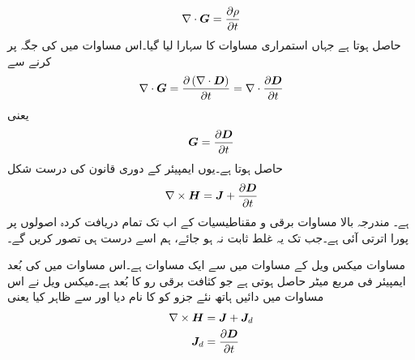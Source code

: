 \begin{align*}
\nabla \cdot {\ensuremath{{\boldsymbol{G}}}}=\frac{\partial \rho}{\partial t}
\end{align*}
حاصل ہوتا ہے جہاں استمراری مساوات کا سہارا لیا گیا۔اس مساوات میں  کی جگہ  پر کرنے سے
\begin{align*}
\nabla \cdot {\ensuremath{{\boldsymbol{G}}}}=\frac{\partial \left(\nabla \cdot {\ensuremath{{\boldsymbol{D}}}} \right)}{\partial t}=\nabla \cdot \frac{\partial {\ensuremath{{\boldsymbol{D}}}}}{\partial t}
\end{align*}
یعنی
 \begin{align*}
{\ensuremath{{\boldsymbol{G}}}}=\frac{\partial {\ensuremath{{\boldsymbol{D}}}}}{\partial t}
\end{align*}
حاصل ہوتا ہے۔یوں ایمپیئر کے دوری قانون کی درست شکل
\begin{align}\label{مساوات-میکس_ویل_دوسری_مساوات_نقطہ_شکل}
\nabla \times {\ensuremath{{\boldsymbol{H}}}}={{\boldsymbol{J}}}+\frac{\partial {\ensuremath{{\boldsymbol{D}}}}}{\partial t}
\end{align}
ہے۔ مندرجہ بالا مساوات برقی و مقناطیسیات کے اب تک تمام دریافت کردہ اصولوں پر پورا اترتی آئی ہے۔جب تک یہ غلط ثابت نہ ہو جائے، ہم اسے درست ہی تصور کریں گے۔

مساوات  میکس ویل کے مساوات میں سے ایک مساوات ہے۔اس مساوات میں  کی بُعد ایمپیئر فی مربع میٹر حاصل ہوتی ہے جو کثافت برقی رو کا بُعد ہے۔میکس ویل نے اس مساوات میں دائیں ہاتھ نئے جزو  کو  کا نام دیا اور  سے ظاہر کیا یعنی
\begin{align*}
\nabla \times {\ensuremath{{\boldsymbol{H}}}}&={{\boldsymbol{J}}}+{{\boldsymbol{J}}}_d\\
{{\boldsymbol{J}}}_d&=\frac{\partial {\ensuremath{{\boldsymbol{D}}}}}{\partial t}
\end{align*}


